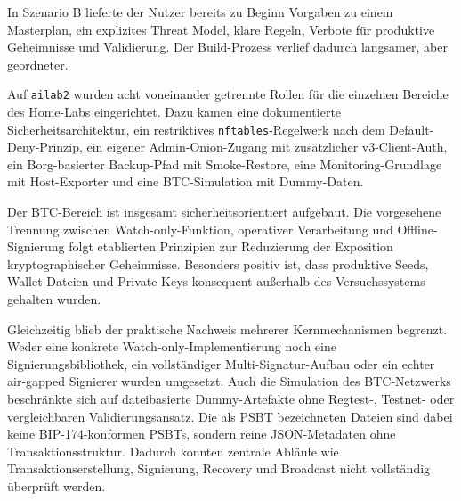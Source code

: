 In Szenario B lieferte der Nutzer bereits zu Beginn Vorgaben zu einem Masterplan, ein explizites Threat Model, klare Regeln, Verbote für produktive Geheimnisse und Validierung. Der Build-Prozess verlief dadurch langsamer, aber geordneter.

Auf \texttt{ailab2} wurden acht voneinander getrennte Rollen für die einzelnen Bereiche des Home-Labs eingerichtet. Dazu kamen eine dokumentierte Sicherheitsarchitektur, ein restriktives \texttt{nftables}-Regelwerk nach dem Default-Deny-Prinzip, ein eigener Admin-Onion-Zugang mit zusätzlicher v3-Client-Auth, ein Borg-basierter Backup-Pfad mit Smoke-Restore, eine Monitoring-Grundlage mit Host-Exporter und eine \ac{BTC}-Simulation mit Dummy-Daten.

Der \ac{BTC}-Bereich ist insgesamt sicherheitsorientiert aufgebaut. Die vorgesehene Trennung zwischen Watch-only-Funktion, operativer Verarbeitung und Offline-Signierung folgt etablierten Prinzipien zur Reduzierung der Exposition kryptographischer Geheimnisse. 
Besonders positiv ist, dass produktive Seeds, Wallet-Dateien und Private Keys konsequent außerhalb des Versuchssystems gehalten wurden. 

Gleichzeitig blieb der praktische Nachweis mehrerer Kernmechanismen begrenzt. Weder eine konkrete Watch-only-Implementierung noch eine Signierungsbibliothek, ein vollständiger Multi-Signatur-Aufbau oder ein echter air-gapped Signierer wurden umgesetzt.
Auch die Simulation des \ac{BTC}-Netzwerks beschränkte sich auf dateibasierte Dummy-Artefakte ohne Regtest-, Testnet- oder vergleichbaren Validierungsansatz. Die als \ac{PSBT} bezeichneten Dateien sind dabei keine \ac{BIP}-174-konformen \acp{PSBT}, sondern reine \ac{JSON}-Metadaten ohne Transaktionsstruktur.
Dadurch konnten zentrale Abläufe wie Transaktionserstellung, Signierung, Recovery und Broadcast nicht vollständig überprüft werden. 

